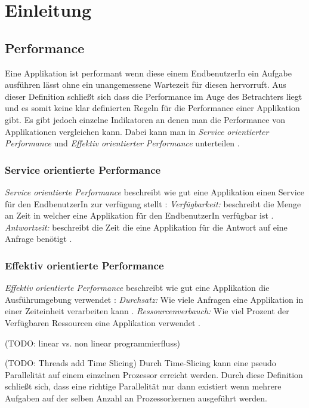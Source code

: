\section{Einleitung}
\label{section:Einleitung}

\subsection{Performance}
Eine Applikation ist performant wenn diese einem EndbenutzerIn ein Aufgabe ausführen lässt ohne ein unangemessene Wartezeit für diesen hervorruft. Aus dieser Definition schließt sich dass die Performance im Auge des Betrachters liegt und es somit keine klar definierten Regeln für die Performance einer Applikation gibt. Es gibt jedoch einzelne Indikatoren an denen man die Performance von Applikationen vergleichen kann. Dabei kann man in \emph{Service orientierter Performance} und \emph{Effektiv orientierter Performance} unterteilen \cite[p. 2]{Mol2009}.

\subsubsection{Service orientierte Performance}

\emph{Service orientierte Performance} beschreibt wie gut eine Applikation einen Service für den EndbenutzerIn zur verfügung stellt \cite[p. 2]{Mol2009}:
  \emph{Verfügbarkeit:} beschreibt die Menge an Zeit in welcher eine Applikation für den EndbenutzerIn verfügbar ist \cite[p. 3]{Mol2009}. 
  \emph{Antwortzeit:} beschreibt die Zeit die eine Applikation für die Antwort auf eine Anfrage benötigt \cite[p. 3]{Mol2009}. 

\subsubsection{Effektiv orientierte Performance}
\emph{Effektiv orientierte Performance} beschreibt wie gut eine Applikation die Ausführumgebung verwendet \cite[p. 2]{Mol2009}:
  \emph{Durchsatz:} Wie viele Anfragen eine Applikation in einer Zeiteinheit verarbeiten kann \cite[p. 2]{Mol2009}.
  \emph{Ressourcenverbauch:} Wie viel Prozent der Verfügbaren Ressourcen eine Applikation verwendet \cite[p. 2]{Mol2009}. 







(TODO: linear vs. non linear programmierfluss)

(TODO: Threads add Time Slicing)
Durch Time-Slicing kann eine pseudo Parallelität auf einem einzelnen Prozessor erreicht werden. Durch diese Definition schließt sich, dass eine richtige Parallelität nur dann existiert wenn mehrere Aufgaben auf der selben Anzahl an Prozessorkernen ausgeführt werden. 







